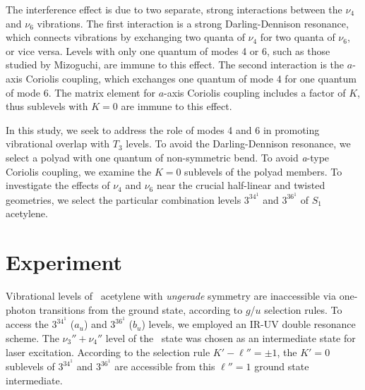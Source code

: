 \documentclass[12pt]{mitthesis}
\begin{document}
The interference effect is due to two separate, strong interactions
between the $\nu_4$ and $\nu_6$ vibrations.  The first interaction is
a strong Darling-Dennison resonance, which connects vibrations by
exchanging two quanta of $\nu_4$ for two quanta of $\nu_6$, or vice
versa.  Levels with only one quantum of modes 4 or 6, such as those
studied by Mizoguchi, are immune to this effect.  The second
interaction is the $a$-axis Coriolis coupling, which exchanges one
quantum of mode 4 for one quantum of mode 6.  The matrix element for
$a$-axis Coriolis coupling includes a factor of $K$, thus sublevels
with $K=0$ are immune to this effect.

In this study, we seek to address the role of modes 4 and 6 in
promoting vibrational overlap with $T_3$ levels.  To avoid the
Darling-Dennison resonance, we select a polyad with one quantum of
non-symmetric bend.  To avoid \emph{a}-type Coriolis coupling, we examine
the $K=0$ sublevels of the polyad members.  To investigate the effects
of $\nu_4$ and $\nu_6$ near the crucial half-linear and twisted
geometries, we select the particular combination levels $3^34^1$ and
$3^36^1$ of $S_1$ acetylene.





























\section{Experiment}

Vibrational levels of \astate\ acetylene with \emph{ungerade}
symmetry are inaccessible via one-photon transitions from the ground
state, according to $g$/$u$ selection rules.  To access the $3^34^1$
($a_u$) and $3^36^1$ ($b_u$) levels, we employed an IR-UV double
resonance scheme.  The $\nu_3''+\nu_4''$ level of the \xstate\ state
was chosen as an intermediate state for laser excitation.  According
to the selection rule $K'-\ell'' = \pm 1$, the $K'=0$ sublevels of
$3^34^1$ and $3^36^1$ are accessible from this $\ell''=1$ ground state
intermediate.
\end{document}
